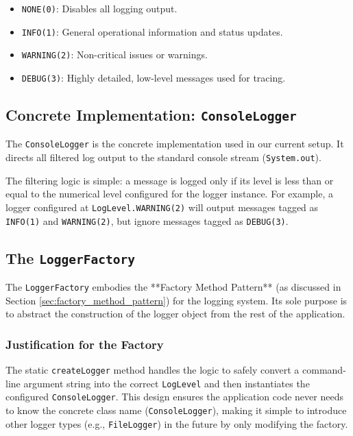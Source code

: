 \documentclass[11pt, a4paper]{article}
\begin{document}
	\begin{itemize}
		\item \texttt{NONE(0)}: Disables all logging output.
		\item \texttt{INFO(1)}: General operational information and status updates.
		\item \texttt{WARNING(2)}: Non-critical issues or warnings.
		\item \texttt{DEBUG(3)}: Highly detailed, low-level messages used for tracing.
	\end{itemize}
	
	\subsection{Concrete Implementation: \texttt{ConsoleLogger}}
	
	The \texttt{ConsoleLogger} is the concrete implementation used in our current setup. It directs all filtered log output to the standard console stream (\texttt{System.out}).
	
	The filtering logic is simple: a message is logged only if its level is less than or equal to the numerical level configured for the logger instance. For example, a logger configured at \texttt{LogLevel.WARNING(2)} will output messages tagged as \texttt{INFO(1)} and \texttt{WARNING(2)}, but ignore messages tagged as \texttt{DEBUG(3)}.
	
	\subsection{The \texttt{LoggerFactory}}
	\label{sec:logger_factory}
	
	The \texttt{LoggerFactory} embodies the **Factory Method Pattern** (as discussed in Section \ref{sec:factory_method_pattern}) for the logging system. Its sole purpose is to abstract the construction of the logger object from the rest of the application.
	
	
	\subsubsection*{Justification for the Factory}
	The static \texttt{createLogger} method handles the logic to safely convert a command-line argument string into the correct \texttt{LogLevel} and then instantiates the configured \texttt{ConsoleLogger}. This design ensures the application code never needs to know the concrete class name (\texttt{ConsoleLogger}), making it simple to introduce other logger types (e.g., \texttt{FileLogger}) in the future by only modifying the factory.
	
\end{document}
